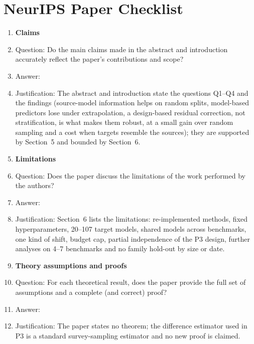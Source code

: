 \section*{NeurIPS Paper Checklist}




\begin{enumerate}

\item {\bf Claims}
    \item[] Question: Do the main claims made in the abstract and introduction accurately reflect the paper's contributions and scope?
    \item[] Answer: \answerYes{} %
    \item[] Justification: The abstract and introduction state the questions Q1--Q4 and the findings (source-model information helps on random splits, model-based predictors lose under extrapolation, a design-based residual correction, not stratification, is what makes them robust, at a small gain over random sampling and a cost when targets resemble the sources); they are supported by Section~5 and bounded by Section~6.

\item {\bf Limitations}
    \item[] Question: Does the paper discuss the limitations of the work performed by the authors?
    \item[] Answer: \answerYes{} %
    \item[] Justification: Section~6 lists the limitations: re-implemented methods, fixed hyperparameters, 20--107 target models, shared models across benchmarks, one kind of shift, budget cap, partial independence of the P3 design, further analyses on 4--7 benchmarks and no family hold-out by size or date.

\item {\bf Theory assumptions and proofs}
    \item[] Question: For each theoretical result, does the paper provide the full set of assumptions and a complete (and correct) proof?
    \item[] Answer: \answerNA{} %
    \item[] Justification: The paper states no theorem; the difference estimator used in P3 is a standard survey-sampling estimator and no new proof is claimed.


\end{enumerate}
